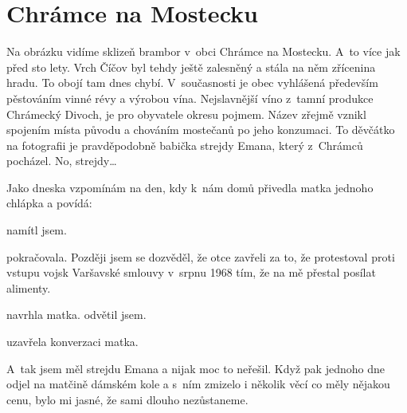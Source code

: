 
\chapter{Chrámce na Mostecku}

Na obrázku vidíme sklizeň brambor v~obci Chrámce na Mostecku. A~to více jak
před sto lety. Vrch Číčov byl tehdy ještě zalesněný a stála na něm zřícenina
hradu. To obojí tam dnes chybí. V~současnosti je obec vyhlášená především
pěstováním vinné révy a výrobou vína. Nejslavnější víno z~tamní produkce
Chrámecký Divoch, je pro obyvatele okresu pojmem. Název zřejmě vznikl spojením
místa původu a chováním mostečanů po jeho konzumaci. To děvčátko na fotografii
je pravděpodobně babička strejdy Emana, který z~Chrámců pocházel. No,
strejdy\dots

Jako dneska vzpomínám na den, kdy k~nám domů přivedla matka jednoho chlápka a
povídá: 

 namítl jsem.

pokračovala. Později jsem se dozvěděl, že otce zavřeli za to, že
protestoval proti vstupu vojsk Varšavské smlouvy v~srpnu 1968 tím, že na mě
přestal posílat alimenty.

 navrhla matka.  odvětil jsem.

 uzavřela konverzaci matka.

A~tak jsem měl strejdu Emana a nijak moc to neřešil. Když pak jednoho dne odjel
na matčině dámském kole a s~ním zmizelo i několik věcí co měly nějakou cenu,
bylo mi jasné, že sami dlouho nezůstaneme.
